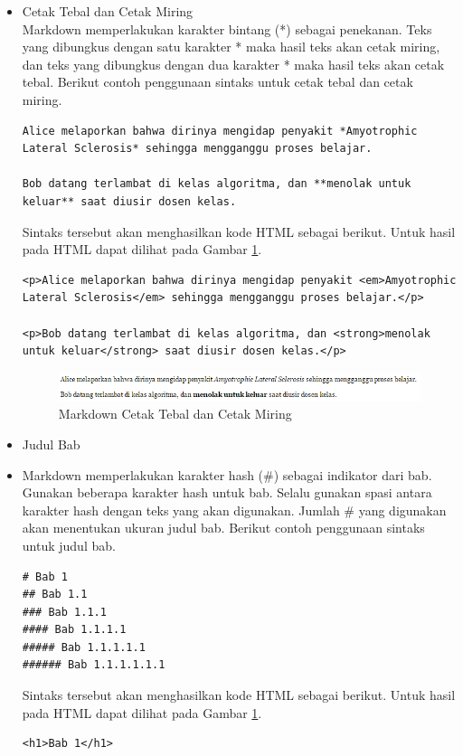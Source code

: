 \begin{itemize}
\item Cetak Tebal dan Cetak Miring\\
Markdown memperlakukan karakter bintang (*) sebagai penekanan. Teks yang dibungkus dengan satu karakter * maka hasil teks akan cetak miring, dan teks yang dibungkus dengan dua karakter * maka hasil teks akan cetak tebal. Berikut contoh penggunaan sintaks untuk cetak tebal dan cetak miring.

\begin{lstlisting}[basicstyle=\footnotesize]
Alice melaporkan bahwa dirinya mengidap penyakit *Amyotrophic Lateral Sclerosis* sehingga mengganggu proses belajar.

Bob datang terlambat di kelas algoritma, dan **menolak untuk keluar** saat diusir dosen kelas.
\end{lstlisting}

Sintaks tersebut akan menghasilkan kode HTML sebagai berikut. Untuk hasil pada HTML dapat dilihat pada Gambar \ref{fig:cmct}.

\begin{lstlisting}[basicstyle=\footnotesize]
<p>Alice melaporkan bahwa dirinya mengidap penyakit <em>Amyotrophic Lateral Sclerosis</em> sehingga mengganggu proses belajar.</p>

<p>Bob datang terlambat di kelas algoritma, dan <strong>menolak untuk keluar</strong> saat diusir dosen kelas.</p>
\end{lstlisting}

\begin{figure}[H]
\centering
\includegraphics[scale=0.7]{Gambar/cmct.png}
\caption[Markdown Cetak Tebal dan Cetak Miring]{Markdown Cetak Tebal dan Cetak Miring}
\label{fig:cmct}
\end{figure}

\item Judul Bab\\
\item Markdown memperlakukan karakter hash (\#) sebagai indikator dari bab. Gunakan beberapa karakter hash untuk bab. Selalu gunakan spasi antara karakter hash dengan teks yang akan digunakan. Jumlah \# yang digunakan akan menentukan ukuran judul bab. Berikut contoh penggunaan sintaks untuk judul bab.
\begin{lstlisting}[basicstyle=\footnotesize]
# Bab 1
## Bab 1.1
### Bab 1.1.1
#### Bab 1.1.1.1
##### Bab 1.1.1.1.1
###### Bab 1.1.1.1.1.1
\end{lstlisting}
Sintaks tersebut akan menghasilkan kode HTML sebagai berikut. Untuk hasil pada HTML dapat dilihat pada Gambar \ref{fig:cmct}.
\begin{lstlisting}[basicstyle=\footnotesize]
<h1>Bab 1</h1>


\end{lstlisting}
\end{itemize}
